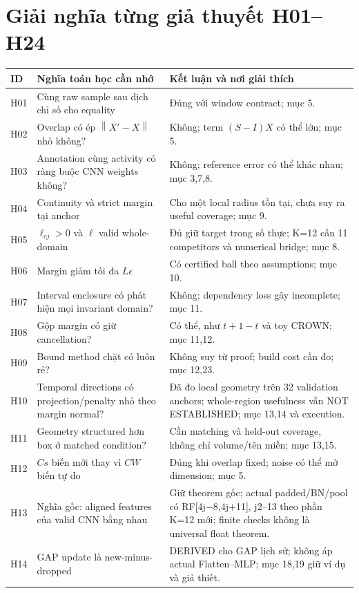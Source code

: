 \documentclass[11pt,a4paper]{article}
\newcommand{\norm}[1]{\left\lVert#1\right\rVert}
\theoremstyle{definition}
\begin{document}
\section{Giải nghĩa từng giả thuyết H01--H24}
\begin{longtable}{@{}p{0.85cm}p{6.9cm}p{5.8cm}@{}}
\toprule ID & Nghĩa toán học cần nhớ & Kết luận và nơi giải thích\\\midrule\endhead
H01 & Cùng raw sample sau dịch chỉ số cho equality & Đúng với window contract;
mục 5.\\
H02 & Overlap có ép $\norm{X'-X}$ nhỏ không? & Không; term $(S-I)X$ có thể
lớn; mục 5.\\
H03 & Annotation cùng activity có ràng buộc CNN weights không? & Không;
reference error có thể khác nhau; mục 3,7,8.\\
H04 & Continuity và strict margin tại anchor & Cho một local radius tồn tại,
chưa suy ra useful coverage; mục 9.\\
H05 & $\ell_{cj}>0$ và $\ell$ valid whole-domain & Đủ giữ target trong số thực; K=12 cần 11 competitors và numerical bridge; mục 8.\\
H06 & Margin giảm tối đa $L\epsilon$ & Có certified ball theo assumptions;
mục 10.\\
H07 & Interval enclosure có phát hiện mọi invariant domain? & Không;
dependency loss gây incomplete; mục 11.\\
H08 & Gộp margin có giữ cancellation? & Có thể, như $t+1-t$ và toy CROWN;
mục 11,12.\\
H09 & Bound method chặt có luôn rẻ? & Không suy từ proof; build cost cần
đo; mục 12,23.\\
H10 & Temporal directions có projection/penalty nhỏ theo margin normal? & Đã đo local geometry trên 32 validation anchors; whole-region usefulness vẫn NOT ESTABLISHED; mục 13,14 và execution.\\
H11 & Geometry structured hơn box ở matched condition? & Cần matching và
held-out coverage, không chỉ volume/tên miền; mục 13,15.\\
H12 & $Cs$ biến mới thay vì $CW$ biến tự do & Đúng khi overlap fixed;
noise có thể mở dimension; mục 5.\\
H13 & Nghĩa gốc: aligned features của valid CNN bằng nhau & Giữ theorem gốc; actual padded/BN/pool có RF[4j$-$8,4j$+$11], j2--13 theo phần K=12 mới; finite checks không là universal float theorem.\\
H14 & GAP update là new-minus-dropped & DERIVED cho GAP lịch sử; không áp actual Flatten--MLP; mục 18,19 giữ ví dụ và giả thiết.\\

\end{longtable}
\end{document}
